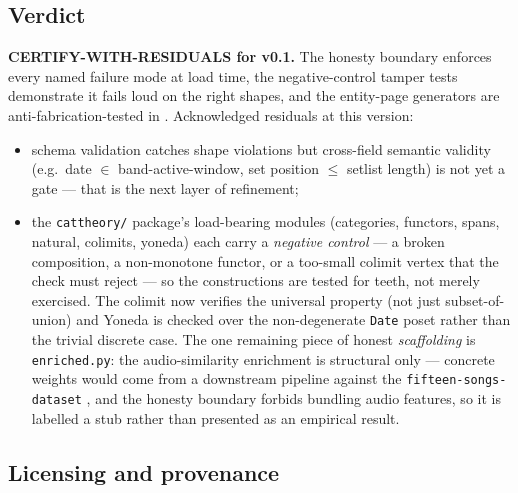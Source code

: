 \documentclass[
]{article}
\providecommand{\tightlist}{%
  \setlength{\itemsep}{0pt}\setlength{\parskip}{0pt}}
\begin{document}
\subsection{Verdict}\label{verdict}

\textbf{CERTIFY-WITH-RESIDUALS for v0.1.} The honesty boundary enforces
every named failure mode at load time, the negative-control tamper tests
demonstrate it fails loud on the right shapes, and the entity-page
generators are anti-fabrication-tested in
. Acknowledged
residuals at this version:

\begin{itemize}
\tightlist
\item
  schema validation catches shape violations but cross-field semantic
  validity (e.g.~date \texorpdfstring{\ensuremath{\in}}{in} band-active-window, set position \texorpdfstring{\ensuremath{\leq}}{<=} setlist
  length) is not yet a gate --- that is the next layer of refinement;
\item
  the \texttt{cattheory/} package's load-bearing modules (categories,
  functors, spans, natural, colimits, yoneda) each carry a
  \emph{negative control} --- a broken composition, a non-monotone
  functor, or a too-small colimit vertex that the check must reject ---
  so the constructions are tested for teeth, not merely exercised. The
  colimit now verifies the universal property (not just subset-of-union)
  and Yoneda is checked over the non-degenerate \texttt{Date} poset
  rather than the trivial discrete case. The one remaining piece of
  honest \emph{scaffolding} is \texttt{enriched.py}: the
  audio-similarity enrichment is structural only --- concrete weights
  would come from a downstream pipeline against the
  \texttt{fifteen-songs-dataset} \citep{fifteen_songs_dataset}, and the
  honesty boundary forbids bundling audio features, so it is labelled a
  stub rather than presented as an empirical result.
\end{itemize}

\subsection{Licensing and provenance}\label{licensing-and-provenance}
\end{document}
